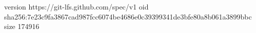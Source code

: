 version https://git-lfs.github.com/spec/v1
oid sha256:7e23c9fa3867cad987fcc6074be4686e0c39399341de3bfe80a8b061a3899bbc
size 174916
